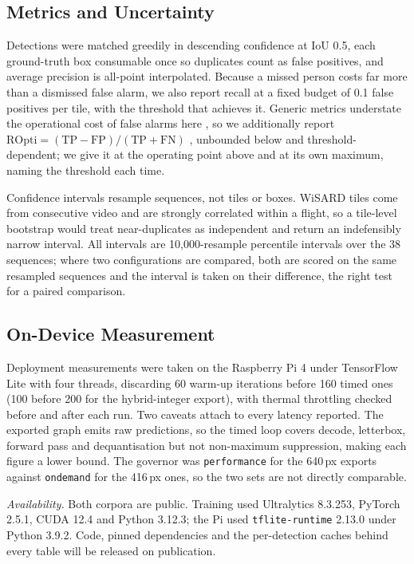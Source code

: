 \documentclass[conference]{IEEEtran}
\begin{document}
\subsection{Metrics and Uncertainty}

Detections were matched greedily in descending confidence at IoU 0.5, each
ground-truth box consumable once so duplicates count as false positives, and
average precision is all-point interpolated. Because a missed person costs far
more than a dismissed false alarm, we also report recall at a fixed budget of
0.1 false positives per tile, with the threshold that achieves it. Generic
metrics understate the operational cost of false alarms here \cite{manzini2023},
so we additionally report
$\mathrm{ROpti}=(\mathrm{TP}-\mathrm{FP})/(\mathrm{TP}+\mathrm{FN})$
\cite{sambolek2024}, unbounded below and threshold-dependent; we give it at the
operating point above and at its own maximum, naming the threshold each time.

Confidence intervals resample sequences, not tiles or boxes. WiSARD tiles come
from consecutive video and are strongly correlated within a flight, so a
tile-level bootstrap would treat near-duplicates as independent and return an
indefensibly narrow interval. All intervals are 10,000-resample percentile
intervals over the 38 sequences; where two configurations are compared, both are
scored on the same resampled sequences and the interval is taken on their
difference, the right test for a paired comparison.

\subsection{On-Device Measurement}
\label{sec:ondevice}

Deployment measurements were taken on the Raspberry Pi 4 under TensorFlow Lite
with four threads, discarding 60 warm-up iterations before 160 timed ones (100
before 200 for the hybrid-integer export), with thermal throttling checked
before and after each run. Two caveats attach to every latency reported. The
exported graph emits raw predictions, so the timed loop covers decode,
letterbox, forward pass and dequantisation but not non-maximum suppression,
making each figure a lower bound. The governor was \texttt{performance} for the
640\,px exports against \texttt{ondemand} for the 416\,px ones, so the two sets
are not directly comparable.

\textit{Availability.} Both corpora are public. Training used Ultralytics
8.3.253, PyTorch 2.5.1, CUDA 12.4 and Python 3.12.3; the Pi used
\texttt{tflite-runtime} 2.13.0 under Python 3.9.2. Code, pinned dependencies and
the per-detection caches behind every table will be released on publication.
\end{document}
